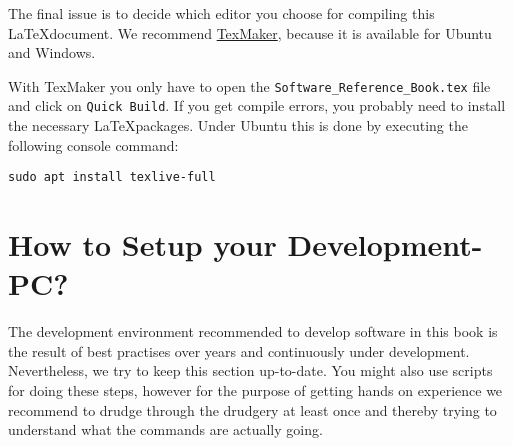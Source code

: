The final issue is to decide which editor you choose for compiling this \LaTeX document. We recommend \href{http://www.xm1math.net/texmaker/}{TexMaker}, because it is available for Ubuntu and Windows.

With TexMaker you only have to open the \verb#Software_Reference_Book.tex# file and click on \verb#Quick Build#. If you get compile errors, you probably need to install the necessary \LaTeX packages. Under Ubuntu this is done by executing the following console command:

\verb#sudo apt install texlive-full#

\section{How to Setup your Development-PC?}
\label{sec:SetupPC}

The development environment recommended to develop software in this book is the result of best practises over years and continuously under development. Nevertheless, we try to keep this section up-to-date. You might also use scripts for doing these steps, however for the purpose of getting hands on experience we recommend to drudge through the drudgery at least once and thereby trying to understand what the commands are actually going.

